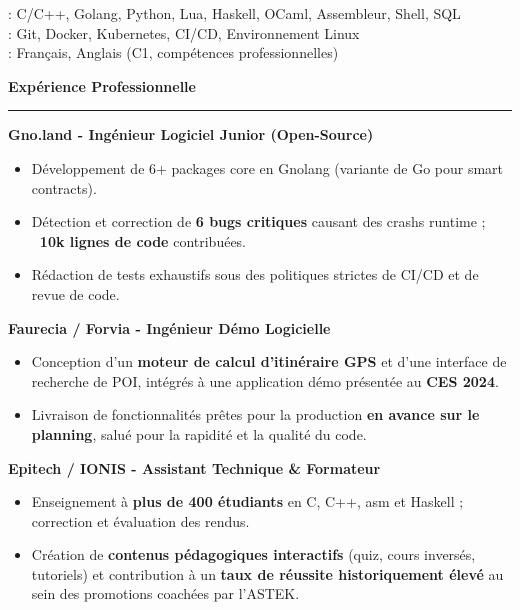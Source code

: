 \documentclass[9pt]{extarticle}
\begin{document}
\hspace*{5pt}{\bfseries Maîtrise}: C/C++, Golang, Python, Lua, Haskell, OCaml, Assembleur, Shell, SQL
\\
\hspace*{5pt}{\bfseries Outils}: Git, Docker, Kubernetes, CI/CD, Environnement Linux
\\
\hspace*{5pt}{\bfseries Langues}: Français, Anglais (C1, compétences professionnelles)

\par\vspace{5pt}

{\large\bfseries Expérience Professionnelle}
\par\vspace{-8pt}
\rule{\linewidth}{0.4pt}
\par\vspace{5pt}

{\bfseries Gno.land - Ingénieur Logiciel Junior (Open-Source)}
\begin{itemize}[noitemsep, topsep=0pt]
	\item Développement de 6+ packages core en Gnolang (variante de Go pour smart contracts).
	\item Détection et correction de {\bfseries 6 bugs critiques} causant des crashs runtime ; {\bfseries ~10k lignes de code} contribuées.
	\item Rédaction de tests exhaustifs sous des politiques strictes de CI/CD et de revue de code.
\end{itemize}

\par\vspace{5pt}

{\bfseries Faurecia / Forvia - Ingénieur Démo Logicielle}
\begin{itemize}[noitemsep, topsep=0pt]
	\item Conception d'un {\bfseries moteur de calcul d'itinéraire GPS} et d'une interface de recherche de POI, intégrés à une application démo présentée au {\bfseries CES 2024}.
	\item Livraison de fonctionnalités prêtes pour la production {\bfseries en avance sur le planning}, salué pour la rapidité et la qualité du code.
\end{itemize}

\par\vspace{5pt}

{\bfseries Epitech / IONIS - Assistant Technique \& Formateur}
\begin{itemize}[noitemsep, topsep=0pt]
	\item Enseignement à {\bfseries plus de 400 étudiants} en C, C++, asm et Haskell ; correction et évaluation des rendus.
	\item Création de {\bfseries contenus pédagogiques interactifs} (quiz, cours inversés, tutoriels) et contribution à un {\bfseries taux de réussite historiquement élevé} au sein des promotions coachées par l'ASTEK.
\end{itemize}
\end{document}
